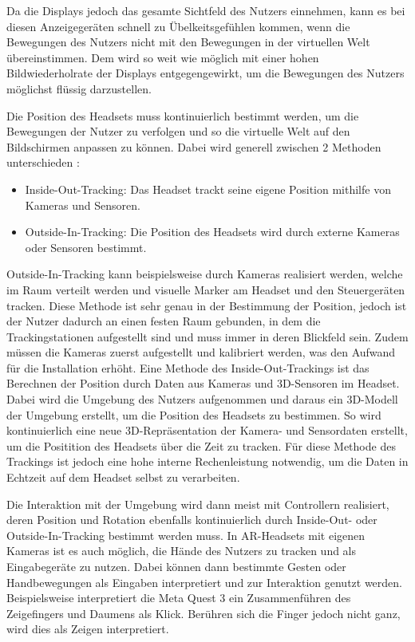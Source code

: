     Da die Displays jedoch das gesamte Sichtfeld des Nutzers einnehmen, kann es bei diesen Anzeigegeräten schnell zu Übelkeitsgefühlen kommen, wenn die Bewegungen des Nutzers nicht mit den Bewegungen in der virtuellen Welt übereinstimmen.
    Dem wird so weit wie möglich mit einer hohen Bildwiederholrate der Displays entgegengewirkt, um die Bewegungen des Nutzers möglichst flüssig darzustellen.

    Die Position des Headsets muss kontinuierlich bestimmt werden, um die Bewegungen der Nutzer zu verfolgen und so die virtuelle Welt auf den Bildschirmen anpassen zu können.
    Dabei wird generell zwischen 2 Methoden unterschieden \autocite[]{Gourlay2017}:
    \begin{itemize}
      \item Inside-Out-Tracking: Das Headset trackt seine eigene Position mithilfe von Kameras und Sensoren.
      \item Outside-In-Tracking: Die Position des Headsets wird durch externe Kameras oder Sensoren bestimmt.
    \end{itemize}

    Outside-In-Tracking kann beispielsweise durch Kameras realisiert werden, welche im Raum verteilt werden und visuelle Marker am Headset und den Steuergeräten tracken.
    Diese Methode ist sehr genau in der Bestimmung der Position, jedoch ist der Nutzer dadurch an einen festen Raum gebunden, in dem die Trackingstationen aufgestellt sind und muss immer in deren Blickfeld sein.
    Zudem müssen die Kameras zuerst aufgestellt und kalibriert werden, was den Aufwand für die Installation erhöht.
    Eine Methode des Inside-Out-Trackings ist das Berechnen der Position durch Daten aus Kameras und 3D-Sensoren im Headset.
    Dabei wird die Umgebung des Nutzers aufgenommen und daraus ein 3D-Modell der Umgebung erstellt, um die Position des Headsets zu bestimmen.
    So wird kontinuierlich eine neue 3D-Repräsentation der Kamera- und Sensordaten erstellt, um die Positition des Headsets über die Zeit zu tracken.
    Für diese Methode des Trackings ist jedoch eine hohe interne Rechenleistung notwendig, um die Daten in Echtzeit auf dem Headset selbst zu verarbeiten.

    Die Interaktion mit der Umgebung wird dann meist mit Controllern realisiert, deren Position und Rotation ebenfalls kontinuierlich durch Inside-Out- oder Outside-In-Tracking bestimmt werden muss.
    In AR-Headsets mit eigenen Kameras ist es auch möglich, die Hände des Nutzers zu tracken und als Eingabegeräte zu nutzen.
    Dabei können dann bestimmte Gesten oder Handbewegungen als Eingaben interpretiert und zur Interaktion genutzt werden.
    Beispielsweise interpretiert die Meta Quest 3 ein Zusammenführen des Zeigefingers und Daumens als Klick.
    Berühren sich die Finger jedoch nicht ganz, wird dies als Zeigen interpretiert.
    
